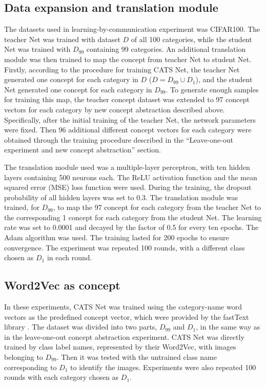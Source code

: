 \documentclass[pdflatex,sn-mathphys-num,lineno]{sn-jnl}%
\begin{document}
\begin{CJK}{UTF8}{gbsn}
\subsection{Data expansion and translation module}
The datasets used in learning-by-communication experiment was CIFAR100. The teacher Net was trained with dataset $D$ of all 100 categories, while the student Net was trained with $D_{99}$ containing 99 categories. An additional translation module was then trained to map the concept from teacher Net to student Net. Firstly, according to the procedure for training CATS Net, the teacher Net generated one concept for each category in $D$ ($D = D_{99} \cup D_1$), and the student Net generated one concept for each category in $D_{99}$. To generate enough samples for training this map, the teacher concept dataset was extended to 97 concept vectors for each category by new concept abstraction described above. Specifically, after the initial training of the teacher Net, the network parameters were fixed. Then 96 additional different concept vectors for each category were obtained through the training procedure described in the “Leave-one-out experiment and new concept abstraction” section. 

The translation module used was a multiple-layer perceptron, with ten hidden layers containing 500 neurons each. The ReLU activation function and the mean squared error (MSE) loss function were used. During the training, the dropout probability of all hidden layers was set to 0.3. The translation module was trained, for $D_{99}$, to map the 97 concept for each category from the teacher Net to the corresponding 1 concept for each category from the student Net. The learning rate was set to 0.0001 and decayed by the factor of 0.5 for every ten epochs. The Adam \cite{kingma_adam_2015} algorithm was used. The training lasted for 200 epochs to ensure convergence. The experiment was repeated 100 rounds, with a different class chosen as $D_1$ in each round.

\subsection{Word2Vec as concept}
In these experiments, CATS Net was trained using the category-name word vectors as the predefined concept vector, which were provided by the fastText library \cite{mikolov_advances_2018}. The dataset was divided into two parts, $D_{99}$ and $D_1$, in the same way as in the leave-one-out concept abstraction experiment. CATS Net was directly trained by class label names, represented by their Word2Vec, with images belonging to $D_{99}$. Then it was tested with the untrained class name corresponding to $D_1$ to identify the images. Experiments were also repeated 100 rounds with each category chosen as $D_1$.


\end{CJK}
\end{document}
